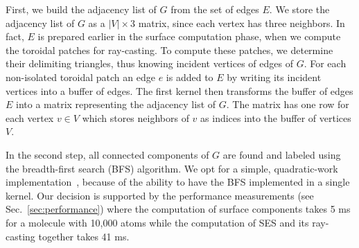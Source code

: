 First, we build the adjacency list of $G$ from the set of edges $E$.
We store the adjacency list of $G$ as a $|V| \times 3$ matrix, since each vertex has three neighbors.
In fact, $E$ is prepared earlier in the surface computation phase, when we compute the toroidal patches for ray-casting.
To compute these patches, we determine their delimiting triangles, thus knowing incident vertices of edges of $G$.
For each non-isolated toroidal patch an edge $e$ is added to $E$ by writing its incident vertices into a buffer of edges.
The first kernel then transforms the buffer of edges $E$ into a matrix representing the adjacency list of $G$.
The matrix has one row for each vertex $v \in V$ which stores neighbors of $v$ as indices into the buffer of vertices $V$.

In the second step, all connected components of $G$ are found and labeled using the breadth-first search (BFS) algorithm.
We opt for a simple, quadratic-work implementation~\cite{merrill2012scalable}, because of the ability to have the BFS implemented in a single kernel.
Our decision is supported by the performance measurements (see Sec.~\ref{sec:performance}) where the computation of surface components takes {\tweakedsim}5 ms for a molecule with {\tweakedsim}10,000 atoms while the computation of SES and its ray-casting together takes {\tweakedsim}41 ms.

